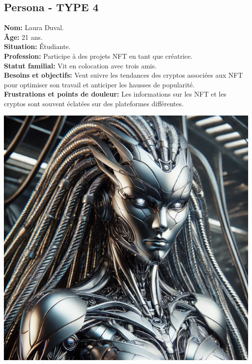 \documentclass[a4paper,11pt]{article}
\begin{document}
\subsection{Persona - TYPE 4}
\begin{minipage}{0.6\textwidth} %
\textbf{Nom:} Laura Duval.\\
\textbf{Âge:} 21 ans.\\
\textbf{Situation:} Étudiante.\\
\textbf{Profession:} Participe à des projets NFT en tant que créatrice.\\
\textbf{Statut familial:} Vit en colocation avec trois amis.\\
\textbf{Besoins et objectifs:} Veut suivre les tendances des cryptos associées aux NFT pour optimiser son travail et anticiper les hausses de popularité.\\
\textbf{Frustrations et points de douleur:} Les informations sur les NFT et les cryptos sont souvent éclatées sur des plateformes différentes.\\
\end{minipage}%
\hspace{1cm}
\begin{minipage}{0.3\textwidth} %
    \begin{center}
        \includegraphics[width=\textwidth]{images/autobott.jpeg} %
    \end{center}
\end{minipage}
\end{document}
